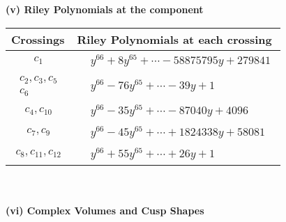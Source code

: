 \documentclass[1p]{elsarticle_modified}
\theoremstyle{definition}
\begin{document}
\newpage\renewcommand{\arraystretch}{1}
\flushleft \textbf{(v) Riley Polynomials at the component}\newline \\
\begin{tabular}{m{50pt}|m{274pt}}
Crossings & \hspace{64pt}Riley Polynomials at each crossing \\
\hline $$\begin{aligned}c_{1}\end{aligned}$$&$\begin{aligned}
&y^{66}+8 y^{65}+\cdots-58875795 y+279841
\end{aligned}$\\
\hline $$\begin{aligned}c_{2},c_{3},c_{5}\\c_{6}\end{aligned}$$&$\begin{aligned}
&y^{66}-76 y^{65}+\cdots-39 y+1
\end{aligned}$\\
\hline $$\begin{aligned}c_{4},c_{10}\end{aligned}$$&$\begin{aligned}
&y^{66}-35 y^{65}+\cdots-87040 y+4096
\end{aligned}$\\
\hline $$\begin{aligned}c_{7},c_{9}\end{aligned}$$&$\begin{aligned}
&y^{66}-45 y^{65}+\cdots+1824338 y+58081
\end{aligned}$\\
\hline $$\begin{aligned}c_{8},c_{11},c_{12}\end{aligned}$$&$\begin{aligned}
&y^{66}+55 y^{65}+\cdots+26 y+1
\end{aligned}$\\
\hline
\end{tabular}\\~\\
\newpage\flushleft \textbf{(vi) Complex Volumes and Cusp Shapes}
\end{document}
